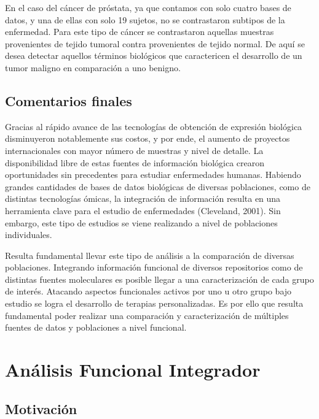 \documentclass[12pt,twoside]{reedthesis}
\begin{document}
En el caso del cáncer de próstata, ya que contamos con solo cuatro bases de datos, y una de ellas con solo 19 sujetos, no se contrastaron subtipos de la enfermedad. Para este tipo de cáncer se contrastaron aquellas muestras provenientes de tejido tumoral contra provenientes de tejido normal. De aquí se desea detectar aquellos términos biológicos que caractericen el desarrollo de un tumor maligno en comparación a uno benigno.

\hypertarget{comentarios-finales-1}{%
\section{Comentarios finales}\label{comentarios-finales-1}}

Gracias al rápido avance de las tecnologías de obtención de expresión biológica disminuyeron notablemente sus costos, y por ende, el aumento de proyectos internacionales con mayor número de muestras y nivel de detalle. La disponibilidad libre de estas fuentes de información biológica crearon oportunidades sin precedentes para estudiar enfermedades humanas. Habiendo grandes cantidades de bases de datos biológicas de diversas poblaciones, como de distintas tecnologías ómicas, la integración de información resulta en una herramienta clave para el estudio de enfermedades (Cleveland, 2001). Sin embargo, este tipo de estudios se viene realizando a nivel de poblaciones individuales.

Resulta fundamental llevar este tipo de análisis a la comparación de diversas poblaciones. Integrando información funcional de diversos repositorios como de distintas fuentes moleculares es posible llegar a una caracterización de cada grupo de interés. Atacando aspectos funcionales activos por uno u otro grupo bajo estudio se logra el desarrollo de terapias personalizadas. Es por ello que resulta fundamental poder realizar una comparación y caracterización de múltiples fuentes de datos y poblaciones a nivel funcional.

\hypertarget{cap:ifa}{%
\chapter{Análisis Funcional Integrador}\label{cap:ifa}}

\hypertarget{motivacion}{%
\section{Motivación}\label{motivacion}}
\end{document}
